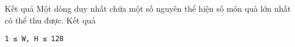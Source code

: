 Kết quả
Một dòng duy nhất chứa một số nguyên thể hiện số món quà lớn nhất có thể thu được.
Kết quả
\begin{verbatim}
1 ≤ W, H ≤ 128
\end{verbatim}